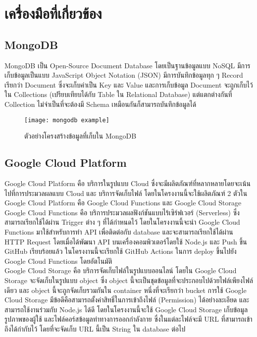 \section{เครื่องมือที่เกี่ยวข้อง}
\subsection{MongoDB}
MongoDB เป็น Open-Source Document Database โดยเป็นฐานข้อมูลแบบ NoSQL มีการเก็บข้อมูลเป็นแบบ JavaScript Object Notation (JSON) มีการบันทึกข้อมูลทุก ๆ Record เรียกว่า Document ซึ่งจะเก็บค่าเป็น Key และ Value และการเก็บข้อมูล Document จะถูกเก็บไว้ใน Collections (เปรียบเทียบได้กับ Table ใน Relational Database) แต่แตกต่างกันที่ Collection ไม่จำเป็นที่จะต้องมี Schema เหมือนกันก็สามารถบันทึกข้อมูลได้

\begin{figure}
    \texttt{[image: mongodb example]}
    \caption{ตัวอย่างโครงสร้างข้อมูลที่เก็บใน MongoDB}
\end{figure}

\subsection{Google Cloud Platform}
Google Cloud Platform คือ บริการในรูปแบบ Cloud ซึ่งจะมีผลิตภัณฑ์ที่หลากหลายโดยจะเน้นไปที่การประมวลผลแบบ Cloud และ บริการจัดเก็บไฟล์ โดยในโครงงานนี้จะใช้ผลิตภัณฑ์ 2 ตัวใน Google Cloud Platform คือ Google Cloud Functions และ Google Cloud Storage
\\\indent
Google Cloud Functions คือ บริการประมวลผลฟังก์ชันแบบไร้เซิร์ฟเวอร์ (Serverless) ซึ่งสามารถเรียกใช้ได้ผ่าน Trigger ต่าง ๆ ที่ได้กำหนดไว้ โดยในโครงงานนี้จะนำ Google Cloud Functions มาใช้สำหรับการทำ API เพื่อติดต่อกับ database และจะสามารถเรียกใช้ได้ผ่าน HTTP Request โดยเมื่อได้พัฒนา API บนเครื่องคอมพิวเตอร์โดยใช้ Node.js และ Push ขึ้น GitHub เรียบร้อยแล้ว ในโครงงานนี้จะเรียกใช้ GitHub Actions ในการ deploy ขึ้นไปยัง Google Cloud Functions โดยอัตโนมัติ
\\\indent
Google Cloud Storage คือ บริการจัดเก็บไฟล์ในรูปแบบออนไลน์ โดยใน Google Cloud Storage จะจัดเก็บในรูปแบบ object ซึ่ง object นี้จะเป็นชุดข้อมูลที่จะประกอบไปด้วยไฟล์เพียงไฟล์เดียว และ object นี้จะถูกจัดเก็บรวมกันใน container หนึ่งที่จะเรียกว่า bucket การใช้ Google Cloud Storage มีข้อดีคือสามารถตั้งค่าสิทธิ์ในการเข้าถึงไฟล์ (Permission) ได้อย่างละเอียด และสามารถใช้งานร่วมกับ Node.js ได้ดี โดยในโครงงานนี้จะใช้ Google Cloud Storage เก็บข้อมูลรูปภาพของผู้ใช้ และไฟล์คอร์สข้อมูลท่าทางการออกกำลังกาย ซึ่งในแต่ละไฟล์จะมี URL ที่สามารถเข้าถึงได้กำกับไว้ โดยที่จะจัดเก็บ URL นี้เป็น String ใน database ต่อไป

